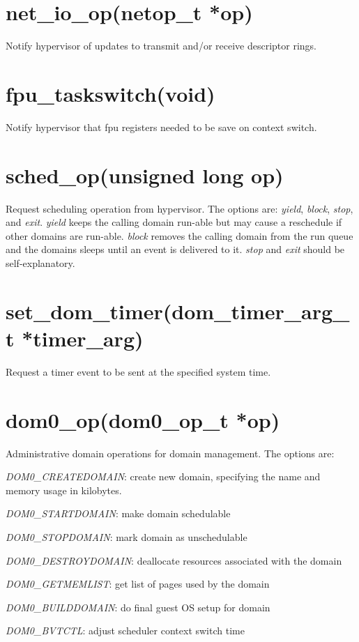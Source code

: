 \documentclass[11pt,twoside,final,openright]{xenstyle}
\begin{document}
\section{ net\_io\_op(netop\_t *op)}  
Notify hypervisor of updates to transmit and/or receive descriptor rings.

\section{ fpu\_taskswitch(void)} 
Notify hypervisor that fpu registers needed to be save on context switch.

\section{ sched\_op(unsigned long op)} 
Request scheduling operation from hypervisor. The options are: {\it yield},
{\it block}, {\it stop}, and {\it exit}. {\it yield} keeps the calling
domain run-able but may cause a reschedule if other domains are
run-able. {\it block} removes the calling domain from the run queue and the
domains sleeps until an event is delivered to it. {\it stop} and {\it exit}
should be self-explanatory.

\section{ set\_dom\_timer(dom\_timer\_arg\_t *timer\_arg)} 
Request a timer event to be sent at the specified system time.

\section{ dom0\_op(dom0\_op\_t *op)} 
Administrative domain operations for domain management. The options are:

{\it DOM0\_CREATEDOMAIN}: create new domain, specifying the name and memory usage
in kilobytes.

{\it DOM0\_STARTDOMAIN}: make domain schedulable

{\it DOM0\_STOPDOMAIN}: mark domain as unschedulable

{\it DOM0\_DESTROYDOMAIN}: deallocate resources associated with the domain

{\it DOM0\_GETMEMLIST}: get list of pages used by the domain

{\it DOM0\_BUILDDOMAIN}: do final guest OS setup for domain

{\it DOM0\_BVTCTL}: adjust scheduler context switch time
\end{document}
